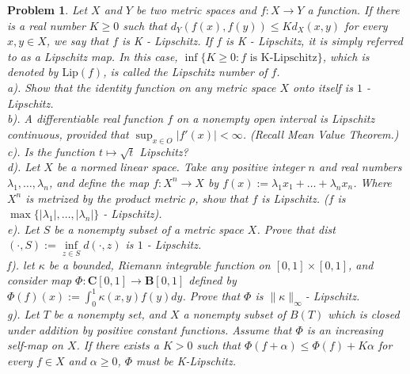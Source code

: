 \documentclass[12pt]{article}
\newtheorem{problem}{Problem}
\begin{document}
\begin{problem}
Let $X$ and $Y$ be two metric spaces and $f: X\to Y$ a function. If there is a real number $K\geq0$ such that $d_{Y}(f(x), f(y))\leq Kd_{X}(x,y)$ for every $x,y\in X$, we say that $f$ is K - Lipschitz. If $f$ is K - Lipschitz, it is simply referred to as a Lipschitz map. In this case, $\inf\{K\geq0: f\text{ is K-Lipschitz}\}$, which is denoted by $\text{Lip}(f)$, is called the Lipschitz number of $f$. \\
\indent a). Show that the identity function on any metric space $X$ onto itself is $1$ - Lipschitz. \\
\indent b). A differentiable real function $f$ on a nonempty open interval is Lipschitz continuous, provided that $\sup_{x\in O}|f'(x)|<\infty$. (Recall Mean Value Theorem.) \\
\indent c). Is the function $t\mapsto \sqrt{t}$ Lipschitz? \\
\indent d). Let $X$ be a normed linear space. Take any positive integer $n$ and real numbers $\lambda_{1}, \dots, \lambda_{n}$, and define the map $f: X^{n}\to X$ by $f(x):=\lambda_{1}x_{1}+\dots+\lambda_{n}x_{n}$. Where $X^{n}$ is metrized by the product metric $\rho$, show that $f$ is Lipschitz. ($f$ is $\max\{|\lambda_{1}|, \dots, |\lambda_{n}|\}$ - Lipschitz). \\
\indent e). Let $S$ be a nonempty subset of a metric space $X$. Prove that dist $(\cdot, S):= \inf\limits_{z\in S}d(\cdot ,z)$ is $1$ - Lipschitz. \\
\indent f). let $\kappa$ be a bounded, Riemann integrable function on $[0,1]\times[0,1]$, and consider map $\Phi:\mathbf{C}[0, 1]\to \mathbf{B}[0, 1]$ defined by $\Phi(f)(x):=\int_{0}^{1}\kappa(x,y)f(y)dy$. Prove that $\Phi$ is $\|\kappa\|_{\infty}$- Lipschitz. \\
\indent g). Let $T$ be a nonempty set, and $X$ a nonempty subset of $B(T)$ which is closed under addition by positive constant functions. Assume that $\Phi$ is an increasing self-map on $X$. If there exists a $K>0$ such that $\Phi(f+\alpha)\leq \Phi(f)+K\alpha$ for every $f\in X$ and $\alpha\geq 0$, $\Phi$ must be K-Lipschitz.
\end{problem}
\end{document}
